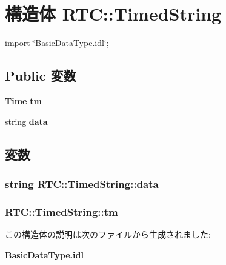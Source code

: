 \section{構造体 RTC::TimedString}
\label{structRTC_1_1TimedString}


{\ttfamily import \char`\"{}BasicDataType.idl\char`\"{};}

\subsection*{Public 変数}
\begin{DoxyCompactItemize}
\item 
{\bf Time} {\bf tm}
\item 
string {\bf data}
\end{DoxyCompactItemize}


\subsection{変数}
\subsubsection[{data}]{\setlength{\rightskip}{0pt plus 5cm}string {\bf RTC::TimedString::data}}\label{structRTC_1_1TimedString_a957ee28a6c97c25c642d039bcb45e947}
\subsubsection[{tm}]{ {\bf RTC::TimedString::tm}}\label{structRTC_1_1TimedString_a06f666e2782f797f9452b83d454ad9fe}


この構造体の説明は次のファイルから生成されました:\begin{DoxyCompactItemize}
\item 
{\bf BasicDataType.idl}\end{DoxyCompactItemize}
